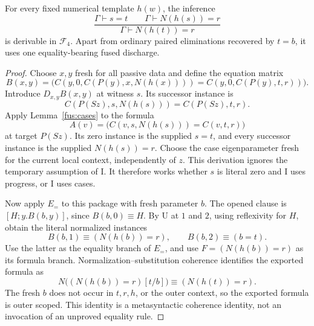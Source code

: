 \begin{theorem}
\label{fus:uncrossed}
For every fixed numerical template $h(w)$, the inference
\[
 \frac{\Gamma\vdash s=t\qquad\Gamma\vdash N(h(s))=r}
      {\Gamma\vdash N(h(t))=r}
\]
is derivable in $\mathcal F_4$. Apart from ordinary paired eliminations
recovered by $t=b$, it uses one equality-bearing fused discharge.
\end{theorem}
\begin{proof}
Choose $x,y$ fresh for all passive data and define the equation matrix
\[
 B(x,y)=\bigl(
 C(y,0,C(P(y),x,N(h(x))))
 =C(y,0,C(P(y),t,r))\bigr).
\]
Introduce $D_{x,y}B(x,y)$ at witness $s$. Its successor instance is
\[
 C(P(Sz),s,N(h(s)))=C(P(Sz),t,r).
\]
Apply Lemma~\ref{fus:cases} to the formula
\[
 A(v)=\bigl(C(v,s,N(h(s)))=C(v,t,r)\bigr)
\]
at target $P(Sz)$. Its zero instance is the supplied $s=t$, and every
successor instance is the supplied $N(h(s))=r$. Choose the case
eigenparameter fresh for the current local context, independently of $z$.
This derivation ignores the temporary assumption of I. It therefore works
whether $s$ is literal zero and I uses progress, or I uses cases.

Now apply $E_{=}$ to this package with fresh parameter $b$. The opened
clause is $[H;y.B(b,y)]$, since $B(b,0)\equiv H$. By U at $1$ and $2$,
using reflexivity for $H$, obtain the literal normalized instances
\[
 B(b,1)\equiv (N(h(b))=r),\qquad B(b,2)\equiv (b=t).
\]
Use the latter as the equality branch of $E_{=}$, and use
$F=(N(h(b))=r)$ as its formula branch. Normalization--substitution coherence
identifies the exported formula as
\[
 N\bigl((N(h(b))=r)[t/b]\bigr)\equiv(N(h(t))=r).
\]
The fresh $b$ does not occur in $t,r,h$, or the outer context, so the
exported formula is outer scoped. This identity is a metasyntactic
coherence identity, not an invocation of an unproved equality rule.
\end{proof}


